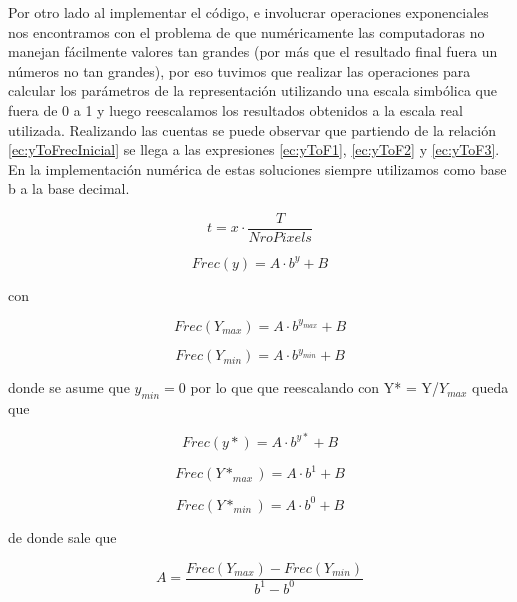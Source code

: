 \documentclass{article}
\begin{document}
    Por otro lado al implementar el código, e involucrar operaciones exponenciales nos encontramos con el problema de que numéricamente las computadoras no manejan fácilmente valores tan grandes (por más que el resultado final fuera un números no tan grandes), por eso tuvimos que realizar las operaciones para calcular los parámetros de la representación utilizando una escala simbólica que fuera de 0 a 1 y luego reescalamos los resultados obtenidos a la escala real utilizada. Realizando las cuentas se puede observar que partiendo de la relación \ref{ec:yToFrecInicial} se llega a las expresiones  \ref{ec:yToF1}, \ref{ec:yToF2} y \ref{ec:yToF3}. En la implementación numérica de estas soluciones siempre utilizamos como base b a la base decimal.
    
    \begin{equation}
        \label{ec:xTot}
        t = x \cdot \frac{T}{NroPixels}
    \end{equation}
    
    \begin{equation}
        \label{ec:yToFrecInicial}
        Frec(y) = A \cdot b^{y} + B
    \end{equation}
    
    con 
    
    \begin{equation*}
        Frec(Y_{max}) = A \cdot b^{y_{max}} + B
    \end{equation*}
    
    \begin{equation*}
        Frec(Y_{min}) = A \cdot b^{y_{min}} + B
    \end{equation*}
    
    donde se asume que $y_{min}=0$ por lo que que reescalando con Y* = Y/$Y_{max}$ queda que
    
    \begin{equation*}
        Frec(y*) = A \cdot b^{y*} + B
    \end{equation*}
    
    \begin{equation*}
        Frec(Y*_{max}) = A \cdot b^{1} + B
    \end{equation*}
    
    \begin{equation*}
        Frec(Y*_{min}) = A \cdot b^{0} + B
    \end{equation*}
    
    de donde sale que 
    
    \begin{equation}
        \label{ec:yToF1}
        A = \frac{Frec(Y_{max}) - Frec(Y_{min}) }{b^1-b^0}
    \end{equation}
    
\end{document}
